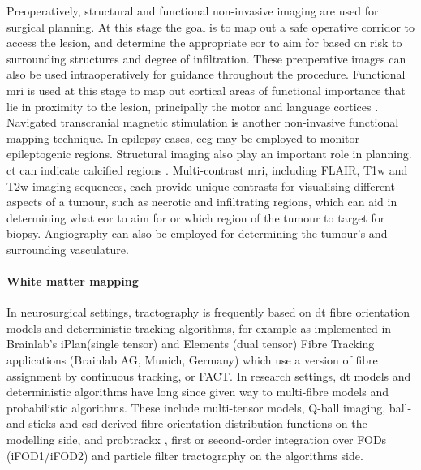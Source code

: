 Preoperatively, structural and functional non-invasive imaging are used for surgical planning.
At this stage the goal is to map out a safe operative corridor to access the lesion, and determine the appropriate \gls{eor} to aim for based on risk to surrounding structures and degree of infiltration.
These preoperative images can also be used intraoperatively for guidance throughout the procedure.
Functional \gls{mri} is used at this stage to map out cortical areas of functional importance that lie in proximity to the lesion, principally the motor and language cortices .
Navigated transcranial magnetic stimulation is another non-invasive functional mapping technique.
In epilepsy cases, \gls{eeg} may be employed to monitor epileptogenic regions.
Structural imaging also play an important role in planning.
\Gls{ct} can indicate calcified regions .
Multi-contrast \gls{mri}, including FLAIR, T1w and T2w imaging sequences, each provide unique contrasts for visualising different aspects of a tumour, such as necrotic and infiltrating regions, which can aid in determining what \gls{eor} to aim for or which region of the tumour to target for biopsy.
Angiography  can also be employed for determining the tumour's and surrounding vasculature.

\paragraph*{White matter mapping}


In neurosurgical settings, tractography is frequently based on \gls{dt} fibre orientation models \autocite{Toescu2020, Yang2021} and deterministic tracking algorithms, for example as implemented in Brainlab's iPlan\textregistered (single tensor)\autocite{Brainlab2012} and Elements (dual tensor)\autocite{Sollmann2020a} Fibre Tracking applications (Brainlab AG, Munich, Germany) which use a version of fibre assignment by continuous tracking, or FACT. \autocite{Mori1999}
In research settings, \gls{dt} models and deterministic algorithms have long since given way to multi-fibre models and probabilistic algorithms.
These include multi-tensor models,\autocite{Peled2006} Q-ball imaging\autocite{Tuch2004}, ball-and-sticks\autocite{Behrens2003} and \gls{csd}-derived fibre orientation distribution functions on the modelling side, and probtrackx \autocite{Behrens2007}, first or second-order integration over FODs (iFOD1/iFOD2)\autocite{Tournier2010} and particle filter tractography \autocite{Girard2014} on the algorithms side.

